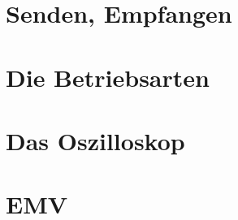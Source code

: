 \documentclass[ngerman, openany, twoside]{texdata/Script}
\begin{document}
\chapter{Senden, Empfangen}


\newpage \vspace*{5cm}
\newpage

\chapter{Die Betriebsarten}


\chapter{Das Oszilloskop}


\chapter{EMV}


%
%


\begin{appendix}
  
\end{appendix}


\clearpage\newpage
{}
\listoffigures

\clearpage\newpage
{}
\renewcommand*\bibname{Literatur- und Quellenverzeichnis}

%

\end{document}
